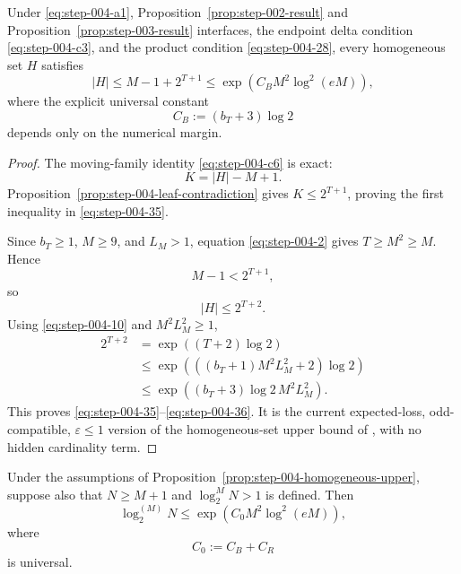 \begin{proposition}
\label{prop:step-004-homogeneous-upper}

Under \eqref{eq:step-004-a1}, Proposition~\ref{prop:step-002-result} and Proposition~\ref{prop:step-003-result} interfaces, the endpoint delta condition \eqref{eq:step-004-c3}, and the product condition \eqref{eq:step-004-28}, every homogeneous set \(H\) satisfies
\[
|H|\le M-1+2^{T+1}
\le\exp\!\left(C_BM^2\log^2(eM)\right),
\tag{35}\label{eq:step-004-35}
\]
where the explicit universal constant
\[
C_B:=(b_T+3)\log2
\tag{36}\label{eq:step-004-36}
\]
depends only on the numerical margin.

\end{proposition}

\begin{proof}

The moving-family identity \eqref{eq:step-004-c6} is exact:
\[
K=|H|-M+1.
\tag{37}\label{eq:step-004-37}
\]
Proposition~\ref{prop:step-004-leaf-contradiction} gives \(K\le 2^{T+1}\), proving the first inequality in \eqref{eq:step-004-35}.

Since \(b_T\ge 1\), \(M\ge 9\), and \(L_M>1\), equation \eqref{eq:step-004-2} gives \(T\ge M^2\ge M\). Hence
\[
M-1<2^{T+1},
\]
so
\[
|H|\le2^{T+2}.
\tag{38}\label{eq:step-004-38}
\]
Using \eqref{eq:step-004-10} and \(M^2L_M^2\ge 1\),
\[
\begin{aligned}
2^{T+2}
&=\exp((T+2)\log2)\\
&\le\exp\!\left(((b_T+1)M^2L_M^2+2)\log2\right)\\
&\le\exp\!\left((b_T+3)\log2\,M^2L_M^2\right).
\end{aligned}
\tag{39}\label{eq:step-004-39}
\]
This proves \eqref{eq:step-004-35}--\eqref{eq:step-004-36}. It is the current expected-loss, odd-compatible, \(\varepsilon\le 1\) version of the homogeneous-set upper bound of \citet{alonEtAl2018private}, with no hidden cardinality term.

\end{proof}


\begin{proposition}
\label{prop:step-004-ramsey-comparison}

Under the assumptions of Proposition~\ref{prop:step-004-homogeneous-upper}, suppose also that \(N\ge M+1\) and \(\log_2^{M}N>1\) is defined. Then
\[
\log_2^{(M)}N
\le\exp\!\left(C_0M^2\log^2(eM)\right),
\tag{40}\label{eq:step-004-40}
\]
where
\[
C_0:=C_B+C_R
\tag{41}\label{eq:step-004-41}
\]
is universal.

\end{proposition}

